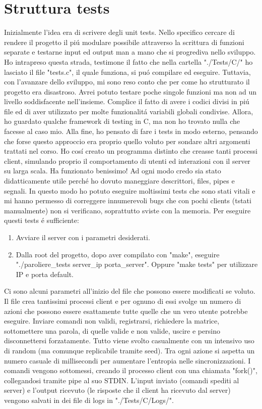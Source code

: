 \chapter{Struttura tests}

Inizialmente l'idea era di scrivere degli unit tests. Nello specifico cercare di rendere il progetto il pi\'u modulare possibile attraverso la scrittura di funzioni separate e testarne input ed output man a mano che si progrediva nello sviluppo. Ho intrapreso questa strada, testimone il fatto che nella cartella "./Tests/C/" ho lasciato il file "tests.c", il quale funziona, si pu\'o compilare ed eseguire. Tuttavia, con l'avanzare dello sviluppo, mi sono reso conto che per come ho strutturato il progetto era disastroso. Avrei potuto testare poche singole funzioni ma non ad un livello soddisfacente nell'insieme. Complice il fatto di avere i codici divisi in pi\'u file ed di aver utilizzato per molte funzionalit\'a variabili globali condivise. Allora, ho guardato qualche framework di testing in C, ma non ho trovato nulla che facesse al caso mio. Alla fine, ho pensato di fare i tests in modo esterno, pensando che forse questo approccio era proprio quello voluto per sondare altri argomenti trattati nel corso. Ho cos\'i creato un programma distinto che creasse tanti processi client, simulando proprio il comportamento di utenti ed interazioni con il server su larga scala. Ha funzionato benissimo! Ad ogni modo credo sia stato didatticamente utile perch\'e ho dovuto maneggiare descrittori, files, pipes e segnali. In questo modo ho potuto eseguire moltissimi tests che sono stati vitali e mi hanno permesso di correggere innumerevoli bugs che con pochi clients (tstati manualmente) non si verificano, soprattutto sviste con la memoria. Per eseguire questi tests \'e sufficiente:

\begin{enumerate}
  \item Avviare il server con i parametri desiderati.
  \item Dalla root del progetto, dopo aver compilato con "make", eseguire "./paroliere\_tests server\_ip porta\_server". Oppure "make tests" per utilizzare IP e porta default.
\end{enumerate}
\leavevmode
Ci sono alcuni parametri all'inizio del file che possono essere modificati se voluto. Il file crea tantissimi processi client e per ognuno di essi svolge un numero di azioni che possono essere esattamente tutte quelle che un vero utente potrebbe eseguire. Inviare comandi non validi, registrarsi, richiedere la matrice, sottomettere una parola, di quelle valide e non valide, uscire e persino disconnettersi forzatamente. Tutto viene svolto casualmente con un intensivo uso di random (ma comunque replicabile tramite seed). Tra ogni azione si aspetta un numero casuale di millisecondi per aumentare l'entropia nelle sincronizzazioni. I comandi vengono sottomessi, creando il processo client con una chiamata "fork()", collegandosi tramite pipe al suo STDIN. L'input inviato (comandi spediti al server) e l'output ricevuto (le risposte che il client ha ricevuto dal server) vengono salvati in dei file di logs in "./Tests/C/Logs/".

